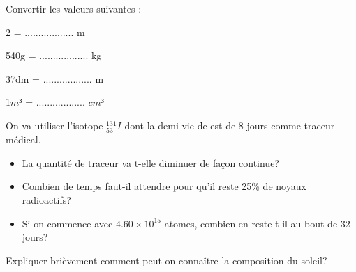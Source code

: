 \documentclass[11pt]{exam}		%
\begin{document}
\begin{questions}

	\clearpage

	\question[2] Convertir les valeurs suivantes :
	\begin{multicols}2
		\centering
		4mm  = .................. m

		\phantom{}

		540g = .................. kg

		37dm = .................. m

		\phantom{}

		1$m³$ = .................. $cm³$

	\end{multicols}

	\question[4] On va utiliser l'isotope $^{131}_{53}I$ dont la demi vie de est de 8 jours comme traceur médical.
	\begin{itemize}
		\item La quantité de traceur va t-elle diminuer de façon continue?
		\item Combien de temps faut-il attendre pour qu'il reste 25\% de noyaux radioactifs?
		\item Si on commence avec $4.60 \times 10^{15}$ atomes, combien en reste t-il au bout de 32 jours?
	\end{itemize}

	\question[2] Expliquer brièvement comment peut-on connaître la composition du soleil?


\end{questions}


\countpoint
\end{document}
